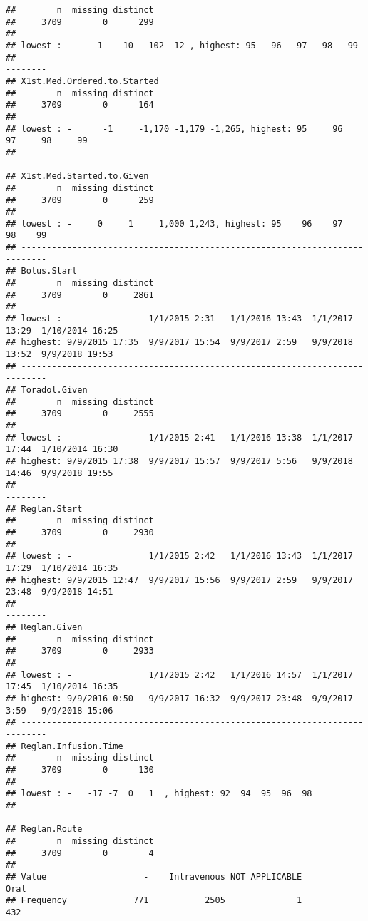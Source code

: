 \documentclass[]{article}
\begin{document}
\begin{verbatim}
##        n  missing distinct 
##     3709        0      299 
## 
## lowest : -    -1   -10  -102 -12 , highest: 95   96   97   98   99  
## ---------------------------------------------------------------------------
## X1st.Med.Ordered.to.Started 
##        n  missing distinct 
##     3709        0      164 
## 
## lowest : -      -1     -1,170 -1,179 -1,265, highest: 95     96     97     98     99    
## ---------------------------------------------------------------------------
## X1st.Med.Started.to.Given 
##        n  missing distinct 
##     3709        0      259 
## 
## lowest : -     0     1     1,000 1,243, highest: 95    96    97    98    99   
## ---------------------------------------------------------------------------
## Bolus.Start 
##        n  missing distinct 
##     3709        0     2861 
## 
## lowest : -               1/1/2015 2:31   1/1/2016 13:43  1/1/2017 13:29  1/10/2014 16:25
## highest: 9/9/2015 17:35  9/9/2017 15:54  9/9/2017 2:59   9/9/2018 13:52  9/9/2018 19:53 
## ---------------------------------------------------------------------------
## Toradol.Given 
##        n  missing distinct 
##     3709        0     2555 
## 
## lowest : -               1/1/2015 2:41   1/1/2016 13:38  1/1/2017 17:44  1/10/2014 16:30
## highest: 9/9/2015 17:38  9/9/2017 15:57  9/9/2017 5:56   9/9/2018 14:46  9/9/2018 19:55 
## ---------------------------------------------------------------------------
## Reglan.Start 
##        n  missing distinct 
##     3709        0     2930 
## 
## lowest : -               1/1/2015 2:42   1/1/2016 13:43  1/1/2017 17:29  1/10/2014 16:35
## highest: 9/9/2015 12:47  9/9/2017 15:56  9/9/2017 2:59   9/9/2017 23:48  9/9/2018 14:51 
## ---------------------------------------------------------------------------
## Reglan.Given 
##        n  missing distinct 
##     3709        0     2933 
## 
## lowest : -               1/1/2015 2:42   1/1/2016 14:57  1/1/2017 17:45  1/10/2014 16:35
## highest: 9/9/2016 0:50   9/9/2017 16:32  9/9/2017 23:48  9/9/2017 3:59   9/9/2018 15:06 
## ---------------------------------------------------------------------------
## Reglan.Infusion.Time 
##        n  missing distinct 
##     3709        0      130 
## 
## lowest : -   -17 -7  0   1  , highest: 92  94  95  96  98 
## ---------------------------------------------------------------------------
## Reglan.Route 
##        n  missing distinct 
##     3709        0        4 
##                                                                       
## Value                   -    Intravenous NOT APPLICABLE           Oral
## Frequency             771           2505              1            432

\end{verbatim}
\end{document}
